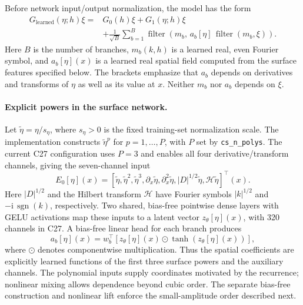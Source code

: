 \documentclass[11pt,letterpaper]{article}
\DeclareMathOperator{\filter}{filter}
\begin{document}
Before network input/output normalization, the model has the form
\begin{equation}
\begin{split}
  G_{\mathrm{learned}}(\eta;h)\xi
  ={}&G_0(h)\xi+G_1(\eta;h)\xi\\
     &+\frac1{\sqrt B}\sum_{b=1}^{B}
       \filter\!\left(m_b,\,
          a_b[\eta]\,\filter(m_b,\xi)\right).
\end{split}
\label{eq:architecture}
\end{equation}
Here $B$ is the number of branches, $m_b(k,h)$ is a learned real, even Fourier
symbol, and $a_b[\eta](x)$ is a learned real spatial field computed from
the surface features specified below. The brackets emphasize that $a_b$
depends on derivatives and transforms of $\eta$ as well as its value at $x$.
Neither $m_b$ nor $a_b$ depends on $\xi$.

\paragraph{Explicit powers in the surface network.}
Let $\widetilde\eta=\eta/s_\eta$, where $s_\eta>0$ is the fixed training-set
normalization scale. The implementation constructs $\widetilde\eta^p$ for
$p=1,\ldots,P$, with $P$ set by \texttt{cs\_n\_polys}. The current C27
configuration uses $P=3$ and enables all four derivative/transform channels,
giving the seven-channel input
\begin{equation}
  E_0[\eta](x)=
  \left[\widetilde\eta,\widetilde\eta^2,\widetilde\eta^3,
  \partial_x\widetilde\eta,\partial_x^2\widetilde\eta,
  |D|^{1/2}\widetilde\eta,\mathcal H\widetilde\eta\right]^{\!\top}(x).
  \label{eq:surface-features}
\end{equation}
Here $|D|^{1/2}$ and the Hilbert transform $\mathcal H$ have Fourier symbols
$|k|^{1/2}$ and $-\mathrm i\,\operatorname{sgn}(k)$, respectively. Two shared,
bias-free pointwise dense layers with GELU activations map these inputs to a
latent vector $z_\theta[\eta](x)$, with 320 channels in C27. A bias-free
linear head for each branch produces
\begin{equation}
  a_b[\eta](x)=w_b^\top\!\left[
    z_\theta[\eta](x)\odot\tanh\!\left(z_\theta[\eta](x)\right)\right],
  \label{eq:spatial-coefficients}
\end{equation}
where $\odot$ denotes componentwise multiplication. Thus the spatial
coefficients are explicitly learned functions of the first three surface
powers and the auxiliary channels. The polynomial inputs supply coordinates
motivated by the recurrence; nonlinear mixing allows dependence beyond cubic
order. The separate bias-free construction and nonlinear lift enforce the
small-amplitude order described next.
\end{document}
